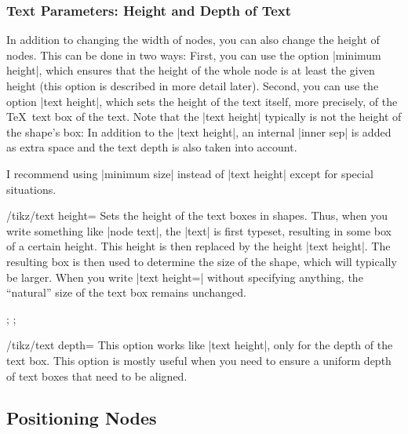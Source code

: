 \subsubsection{Text Parameters: Height and Depth of Text}

In addition to changing the width of nodes, you can also change the
height of nodes. This can be done in two ways: First, you can use the
option |minimum height|, which ensures that the height of the whole
node is at least the given height (this option is described in more
detail later). Second, you can use the option |text height|, which
sets the height of the text itself, more precisely, of the \TeX\ text
box of the text. Note that the |text height| typically is not the
height of the shape's box: In addition to the |text height|, an
internal |inner sep| is added as extra space and the text depth is
also taken into account.

I recommend using |minimum size| instead of |text height| except for
special situations.

\begin{key}{/tikz/text height=}
  Sets the height of the text boxes in shapes. Thus, when you write
  something like |node {text}|, the |text| is first typeset, resulting
  in some box of a certain height. This height is then replaced by the
  height |text height|. The resulting box is then used to determine
  the size of the shape, which will typically be larger. When you
  write |text height=| without specifying anything, the ``natural''
  size of the text box remains unchanged.
\begin{codeexample}[]
\tikz {};
\tikz {};
\end{codeexample}
\end{key}

\begin{key}{/tikz/text depth=}
  This option works like |text height|, only for the depth of the text
  box. This option is mostly useful when you need to ensure a uniform
  depth of text boxes that need to be aligned.
\end{key}



\subsection{Positioning Nodes}

\label{section-nodes-anchors}

